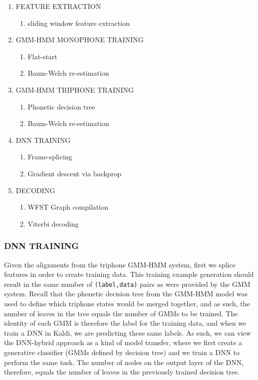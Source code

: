 \documentclass[10pt,a4paper]{article}
\begin{document}
\begin{enumerate}

\item FEATURE EXTRACTION
  \begin{enumerate}
  \item sliding window feature extraction
  \end{enumerate}
  

\item GMM-HMM MONOPHONE TRAINING
  \begin{enumerate}
  \item Flat-start
  \item Baum-Welch re-estimation
  \end{enumerate}
  
\item GMM-HMM TRIPHONE TRAINING  
  \begin{enumerate}
  \item Phonetic decision tree
  \item Baum-Welch re-estimation
  \end{enumerate}

  
\item DNN TRAINING
  \begin{enumerate}
  \item Frame-splicing
  \item Gradient descent via backprop
  \end{enumerate}
  
\item DECODING
  \begin{enumerate}
  \item WFST Graph compilation
  \item Viterbi decoding
  \end{enumerate}
  
\end{enumerate}


\subsubsection*{DNN TRAINING}

Given the alignments from the triphone GMM-HMM system, first we splice features in order to create training data. This training example generation should result in the same number of \texttt{(label,data)} pairs as were provided by the GMM system. Recall that the phonetic decision tree from the GMM-HMM model was used to define which triphone states would be merged together, and as such, the number of leaves in the tree equals the number of GMMs to be trained. The identity of each GMM is therefore the label for the training data, and when we train a DNN in Kaldi, we are predicting these same labels. As such, we can view the DNN-hybrid approach as a kind of model transfer, where we first create a generative classifier (GMMs defined by decision tree) and we train a DNN to perform the same task. The number of nodes on the output layer of the DNN, therefore, equals the number of leaves in the previously trained decision tree.
\end{document}
